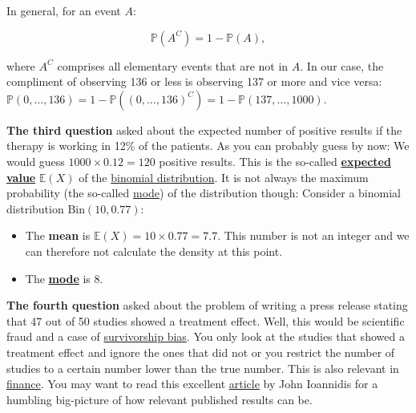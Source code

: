\documentclass[
]{book}
\providecommand{\tightlist}{%
  \setlength{\itemsep}{0pt}\setlength{\parskip}{0pt}}
\begin{document}
In general, for an event \(A\):

\[\mathbb{P}(A^C) = 1 - \mathbb{P}(A),\]

where \(A^C\) comprises all elementary events that are not in \(A\). In our case, the compliment of observing 136 or less is observing 137 or more and vice versa:
\(\mathbb{P}(0, \dots, 136) = 1 - \mathbb{P}((0, \dots, 136)^C) = 1 - \mathbb{P}(137, \dots, 1000)\).

\textbf{The third question} asked about the expected number of positive results if the therapy is working in 12\% of the patients.
As you can probably guess by now: We would guess \(1000 \times 0.12 = 120\) positive results.
This is the so-called \textbf{\href{https://en.wikipedia.org/wiki/Expected_value}{expected value}} \(\mathbb{E}(X)\) of the \href{https://en.wikipedia.org/wiki/Binomial_distribution}{binomial distribution}.
It is not always the maximum probability (the so-called \href{https://en.wikipedia.org/wiki/Mode_(statistics)}{mode}) of the distribution though:
Consider a binomial distribution \(\text{Bin}(10, 0.77)\):

\begin{itemize}
\tightlist
\item
  The \textbf{mean} is \(\mathbb{E}(X) = 10 \times 0.77 = 7.7\). This number is not an integer and we can therefore not calculate the density at this point.
\item
  The \textbf{\href{https://en.wikipedia.org/wiki/Mode_(statistics)}{mode}} is 8.
\end{itemize}

\textbf{The fourth question} asked about the problem of writing a press release stating that 47 out of 50 studies showed a treatment effect.
Well, this would be scientific fraud and a case of \href{https://en.wikipedia.org/wiki/Survivorship_bias\#:~:text=Survivorship\%20bias\%20or\%20survival\%20bias,conclusions\%20because\%20of\%20incomplete\%20data.}{survivorship bias}.
You only look at the studies that showed a treatment effect and ignore the ones that did not or you restrict the number of studies to a certain number lower than the true number.
This is also relevant in \href{https://www.investopedia.com/terms/s/survivorship-bias-risk.asp\#:~:text=This\%20risk\%20arises\%20from\%20focusing,or\%20removed\%20from\%20performance\%20data.}{finance}.
You may want to read this excellent \href{https://journals.plos.org/plosmedicine/article?id=10.1371/journal.pmed.0020124}{article} by John Ioannidis for a humbling big-picture of how relevant published results can be.
\end{document}
